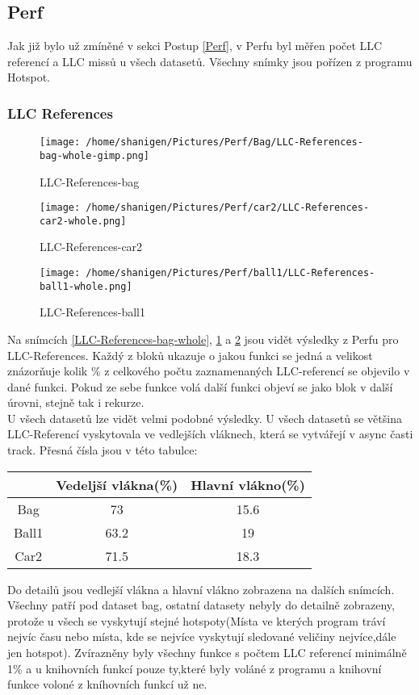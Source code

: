 \documentclass{article}
\begin{document}
\subsection{Perf}
Jak již bylo už zmíněné v sekci Postup \ref{Perf}, v Perfu byl měřen počet LLC referencí a LLC missů u všech datasetů. Všechny snímky jsou pořízen z programu Hotspot.
\subsubsection{LLC References}
\begin{figure}[h!]
	\centering
	\texttt{[image: /home/shanigen/Pictures/Perf/Bag/LLC-References-bag-whole-gimp.png]}
	\caption{LLC-References-bag}
	\label{LLC-References-bag-whole}
	\vspace{0.3cm}
	\centering
	\texttt{[image: /home/shanigen/Pictures/Perf/car2/LLC-References-car2-whole.png]}
	\caption{LLC-References-car2}
	\label{LLC-References-car2-whole}
\end{figure}
\begin{figure}[h!]
	\centering
	\texttt{[image: /home/shanigen/Pictures/Perf/ball1/LLC-References-ball1-whole.png]}
	\caption{LLC-References-ball1}
	\label{LLC-References-ball1-whole}
\end{figure}
Na snímcích \ref{LLC-References-bag-whole}, \ref{LLC-References-car2-whole} a \ref{LLC-References-ball1-whole} jsou vidět výsledky z Perfu pro LLC-References. Každý z bloků ukazuje o jakou funkci se jedná a velikost znázorňuje kolik \% z celkového počtu zaznamenaných LLC-referencí se objevilo v dané funkci. Pokud ze sebe funkce volá další funkci objeví se jako blok v další úrovni, stejně tak i rekurze.\\
U všech datasetů lze vidět velmi podobné výsledky. U všech datasetů se většina LLC-Referencí vyskytovala ve vedlejších vláknech, která se vytvářejí v async časti track. Přesná čísla jsou v této tabulce:\\
\begin{center}
\begin{tabular}{|c|c|c|}
	\hline 
	& Vedeljší vlákna(\%) & Hlavní vlákno(\%) \\ 
	\hline 
	Bag & 73 & 15.6 \\ 
	\hline 
	Ball1 & 63.2 & 19 \\ 
	\hline 
	Car2 & 71.5 & 18.3 \\ 
	\hline
\end{tabular}
\end{center}
Do detailů jsou vedlejší vlákna a hlavní vlákno zobrazena na dalších snímcích. Všechny patří pod dataset bag, ostatní datasety nebyly do detailně zobrazeny, protože u všech se vyskytují stejné hotspoty(Místa ve kterých program tráví nejvíc času nebo místa, kde se nejvíce vyskytují sledované veličiny nejvíce,dále jen hotspot). Zvírazněny byly všechny funkce s počtem LLC referencí minimálně 1\% a u knihovních funkcí pouze ty,které byly voláné z programu a knihovní funkce voloné z kníhovních funkcí už ne.
\newpage
\end{document}
